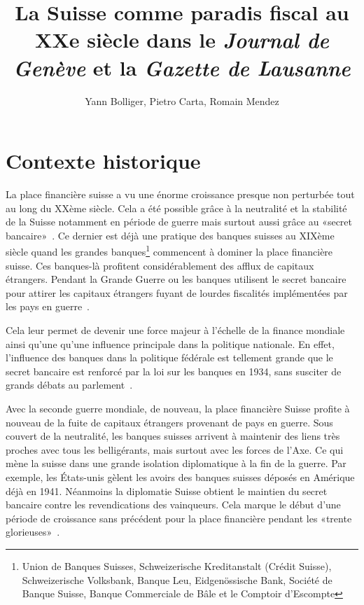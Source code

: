 \documentclass[11pt]{article}
\title{La Suisse comme paradis fiscal au XXe siècle dans le
\textit{Journal de Genève} et la \textit{Gazette de Lausanne}}
\author{Yann Bolliger, Pietro Carta, Romain Mendez}
\begin{document}
\maketitle

\section{Contexte historique}

La place financière suisse a vu une énorme croissance presque non perturbée tout
au long du XXème siècle. Cela a été possible grâce à la neutralité et la
stabilité de la Suisse notamment en période de guerre mais surtout aussi grâce
au «secret bancaire»~\citep[p. 512]{Mazbouri12}. Ce dernier
est déjà une pratique des banques suisses au XIXème siècle quand les grandes
banques\footnote{Union de Banques Suisses, Schweizerische Kreditanstalt (Crédit
Suisse), Schweizerische Volksbank, Banque Leu, Eidgenössische Bank, Société de
Banque Suisse, Banque Commerciale de Bâle et le Comptoir d’Escompte} commencent
à dominer la place financière suisse. Ces banques-là profitent considérablement
des afflux de capitaux étrangers. Pendant la Grande Guerre ou les banques utilisent
le secret bancaire pour attirer les capitaux étrangers fuyant de lourdes
fiscalités implémentées par les pays en guerre~\citep[p. 484-486]{Mazbouri12}.

Cela leur permet de devenir une force majeur à l’échelle de la finance mondiale
ainsi qu’une qu’une influence principale dans la politique nationale. En effet,
l’influence des banques dans la politique fédérale est tellement grande que
le secret bancaire est renforcé par la loi sur les banques en 1934, sans
susciter de grands débats au parlement~\citep{Guex99}. 

Avec la seconde guerre mondiale, de nouveau, la place financière Suisse profite
à nouveau de la fuite de capitaux étrangers provenant de pays en guerre. Sous
couvert de la neutralité, les banques suisses arrivent à maintenir des liens
très proches avec tous les belligérants, mais surtout avec les forces de l’Axe.
Ce qui mène la suisse dans une grande isolation diplomatique à la fin de la
guerre. Par exemple, les États-unis gèlent les avoirs des banques suisses
déposés en Amérique déjà en 1941. Néanmoins la diplomatie Suisse obtient le
maintien du secret bancaire contre les revendications des vainqueurs. Cela
marque le début d’une période de croissance sans précédent pour la place
financière pendant les «trente glorieuses»~\citep[p. 495]{Mazbouri12}.
\end{document}

